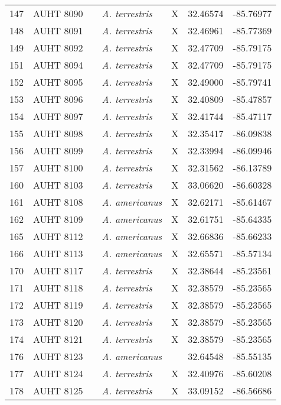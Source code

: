 \begin{longtable}{ lllllll }
147 & AUHT 8090 &  & \textit{A. terrestris} & X & 32.46574 & -85.76977 \\ 
148 & AUHT 8091 &  & \textit{A. terrestris} & X & 32.46961 & -85.77369 \\ 
149 & AUHT 8092 &  & \textit{A. terrestris} & X & 32.47709 & -85.79175 \\ 
151 & AUHT 8094 &  & \textit{A. terrestris} & X & 32.47709 & -85.79175 \\ 
152 & AUHT 8095 &  & \textit{A. terrestris} & X & 32.49000 & -85.79741 \\ 
153 & AUHT 8096 &  & \textit{A. terrestris} & X & 32.40809 & -85.47857 \\ 
154 & AUHT 8097 &  & \textit{A. terrestris} & X & 32.41744 & -85.47117 \\ 
155 & AUHT 8098 &  & \textit{A. terrestris} & X & 32.35417 & -86.09838 \\ 
156 & AUHT 8099 &  & \textit{A. terrestris} & X & 32.33994 & -86.09946 \\ 
157 & AUHT 8100 &  & \textit{A. terrestris} & X & 32.31562 & -86.13789 \\ 
160 & AUHT 8103 &  & \textit{A. terrestris} & X & 33.06620 & -86.60328 \\ 
161 & AUHT 8108 &  & \textit{A. americanus} & X & 32.62171 & -85.61467 \\ 
162 & AUHT 8109 &  & \textit{A. americanus} & X & 32.61751 & -85.64335 \\ 
165 & AUHT 8112 &  & \textit{A. americanus} & X & 32.66836 & -85.66233 \\ 
166 & AUHT 8113 &  & \textit{A. americanus} & X & 32.65571 & -85.57134 \\ 
170 & AUHT 8117 &  & \textit{A. terrestris} & X & 32.38644 & -85.23561 \\ 
171 & AUHT 8118 &  & \textit{A. terrestris} & X & 32.38579 & -85.23565 \\ 
172 & AUHT 8119 &  & \textit{A. terrestris} & X & 32.38579 & -85.23565 \\ 
173 & AUHT 8120 &  & \textit{A. terrestris} & X & 32.38579 & -85.23565 \\ 
174 & AUHT 8121 &  & \textit{A. terrestris} & X & 32.38579 & -85.23565 \\ 
176 & AUHT 8123 &  & \textit{A. americanus} &  & 32.64548 & -85.55135 \\ 
177 & AUHT 8124 &  & \textit{A. terrestris} & X & 32.40976 & -85.60208 \\ 
178 & AUHT 8125 &  & \textit{A. terrestris} & X & 33.09152 & -86.56686 \\ 

\end{longtable}
